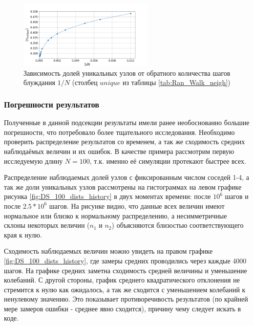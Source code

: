 \begin{figure}[h]
\begin{minipage}{0.49\textwidth}
\label{fig:DS_n_iu}
\end{minipage}
\centering
\includegraphics[width=0.6\textwidth]{Sections/Images_2/Rand_Path_n_unique.png}
\caption{Зависимость долей уникальных узлов от обратного количества шагов блуждания $1/N$ (столбец $unique$ из таблицы \ref{tab:Ran_Walk_neigh})}
\label{fig:DS_n_u}
\end{figure} 

\newpage

\subsubsection{Погрешности результатов}

Полученные в данной подсекции результаты имели ранее необоснованно большие погрешности, что потребовало более тщательного исследования. 
Необходимо проверить распределение результатов со временем, а так же сходимость средних наблюдаёмых величин и их ошибок.
 В качестве примера рассмотрим первую исследуемую длину $N=100$, т.к. именно её симуляции протекают быстрее всех.  

Распределение наблюдаемых долей узлов с фиксированным числом соседей 1-4, а так же доли уникальных узлов рассмотрены на гистограммах на левом графике рисунка \ref{fig:DS_100_dists_history}  в двух моментах времени: после $10^6$ шагов и после $2.5 * 10^6$  шагов. 
На рисунке видно, что данные всех величин имеют нормальное или близко к нормальному распределению, а несимметричные склоны  некоторых величин ($n_1$ и $n_2$) объясняются близостью соответствующего края к нулю.

Сходимость наблюдаемых величин можно увидеть на правом графике \ref{fig:DS_100_dists_history}, где замеры средних проводились через каждые 4000 шагов. На графике средних заметна сходимость средней величины и уменьшение колебаний. 
С другой стороны, график среднего квадратического отклонения не стремится к нулю как ожидалось, а так же сходится с уменьшением колебаний к ненулевому значению. 
Это показывает противоречивость результатов (по крайней мере замеров ошибки - среднее явно сходится), причину чему следует искать в коде. 

